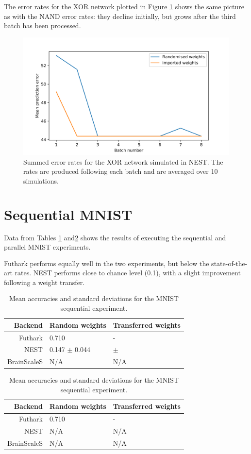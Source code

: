 \documentclass[report.tex]{subfiles}
\begin{document}
The error rates for the XOR network plotted in Figure \ref{fig:xor_snn} shows
the same picture as with the NAND error rates: they decline initially, but grows
after the third batch has been processed.

\begin{figure}
  \includegraphics[width=\linewidth]{images/xor.png}
  \caption{Summed error rates for the XOR network simulated in NEST. The rates
  are produced following each batch and are averaged over 10 simulations.}
  \label{fig:xor_snn}
\end{figure}

\FloatBarrier

\section{Sequential MNIST}

Data from Tables \ref{tab:mnist_seq} and\ref{tab:mnist_par} shows the results of
executing the sequential and parallel MNIST experiments.

Futhark performs equally well in the two experiments, but below the
state-of-the-art rates.
NEST performs close to chance level (0.1), with a slight improvement following a
weight transfer.

\begin{table}
  \begin{tabular}{r l l}
  Backend & Random weights & Transferred weights \\ \hline
  Futhark & 0.710 & - \\ 
  NEST & 0.147 $\pm$ 0.044 & $\pm$ \\
  BrainScaleS & N/A & N/A
  \end{tabular}
  \caption{Mean accuracies and standard deviations for the MNIST sequential experiment.}
  \label{tab:mnist_seq}
\end{table}

\begin{table}
  \begin{tabular}{r l l}
  Backend & Random weights & Transferred weights \\ \hline
  Futhark & 0.710 & - \\ 
  NEST & N/A & N/A \\
  BrainScaleS & N/A & N/A
  \end{tabular}
  \caption{Mean accuracies and standard deviations for the MNIST sequential experiment.}
  \label{tab:mnist_par}
\end{table}
\end{document}
